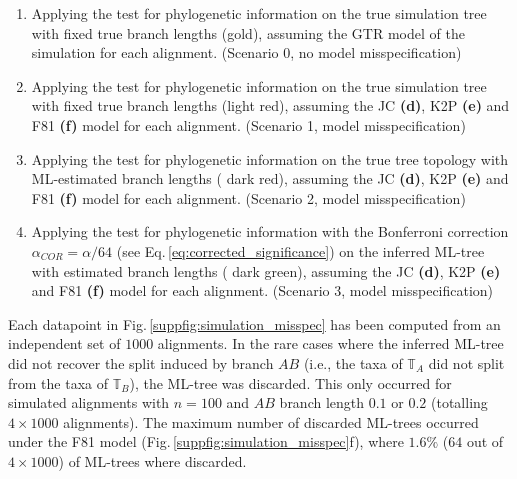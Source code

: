\begin{appendices}
\begin{enumerate}
\item  Applying the test for phylogenetic information on the true simulation tree with fixed true branch lengths ({\color{truetreeNoMisspecification}gold}), assuming the GTR model of the simulation for each alignment. (Scenario 0, no model misspecification)
\item Applying the test for phylogenetic information on the true simulation tree with fixed true branch lengths ({\color{truetree}light red}), assuming the JC \textbf{(d)}, K2P \textbf{(e)} and F81 \textbf{(f)} model for each alignment. (Scenario 1, model misspecification)
\item Applying the test for phylogenetic information on the true tree topology with ML-estimated branch lengths ({\color{truetreeML} dark red}), assuming the JC \textbf{(d)}, K2P \textbf{(e)} and F81 \textbf{(f)} model for each alignment. (Scenario 2, model misspecification)
\item Applying the test for phylogenetic information with the  Bonferroni correction $\alpha_{COR} = \alpha/64$ (see Eq.\,\eqref{eq:corrected_significance}) on the inferred ML-tree with estimated branch lengths ({\color{MLtreeBonferroni} dark green}), assuming the JC \textbf{(d)}, K2P \textbf{(e)} and F81 \textbf{(f)}  model for each alignment. (Scenario 3, model misspecification) 
\end{enumerate}

\medskip

Each datapoint in Fig.\,\ref{suppfig:simulation_misspec} has been computed from an independent set of $1000$ alignments.  In the rare cases where the inferred ML-tree did not recover the split induced by branch $AB$ (i.e., the taxa of $\mathbb{T}_A$ did not split from the taxa
of $\mathbb{T}_B$), the ML-tree was discarded. This only occurred for simulated alignments with $n = 100$ and $AB$ branch length $0.1$ or $0.2$ (totalling $4\times1000$ alignments). The maximum number of discarded ML-trees occurred under the F81 model (Fig.\,\ref{suppfig:simulation_misspec}f), where $1.6\%$ ($64$ out of $4\times1000$) of ML-trees where discarded.



%


\end{appendices}

